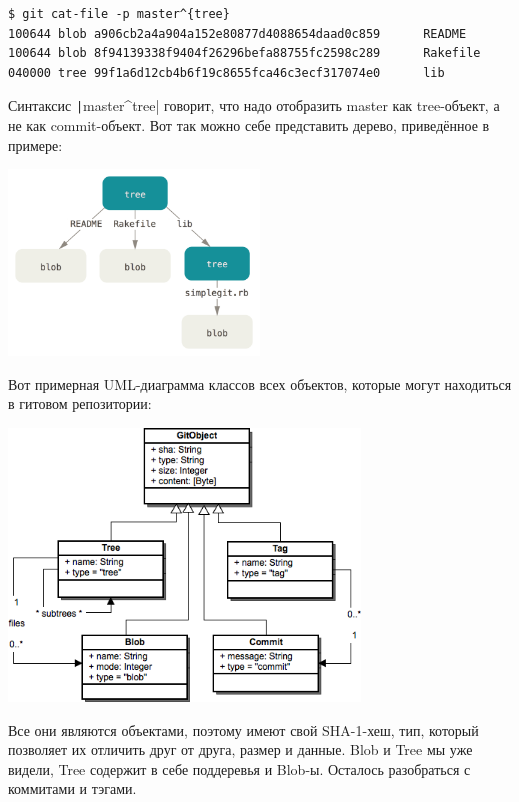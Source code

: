 \documentclass[a5paper]{article}
\begin{document}
\begin{verbatim}
$ git cat-file -p master^{tree}
100644 blob a906cb2a4a904a152e80877d4088654daad0c859      README
100644 blob 8f94139338f9404f26296befa88755fc2598c289      Rakefile
040000 tree 99f1a6d12cb4b6f19c8655fca46c3ecf317074e0      lib
\end{verbatim}

Синтаксис \texttt|master^{tree}| говорит, что надо отобразить master как tree-объект, а не как commit-объект. Вот так можно себе представить дерево, приведённое в примере:

\begin{center}
    \includegraphics[width=0.5\textwidth]{gitTreeObject.png}
\end{center}

Вот примерная UML-диаграмма классов всех объектов, которые могут находиться в гитовом репозитории:
\begin{center}
    \includegraphics[width=0.7\textwidth]{gitDataStructure.png}
\end{center}

Все они являются объектами, поэтому имеют свой SHA-1-хеш, тип, который позволяет их отличить друг от друга, размер и данные. Blob и Tree мы уже видели, Tree содержит в себе поддеревья и Blob-ы. Осталось разобраться с коммитами и тэгами. 
\end{document}
